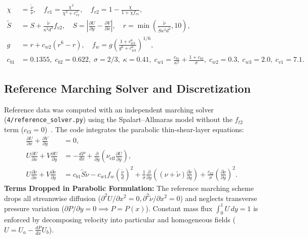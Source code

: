 \documentclass[11pt,a4paper]{article}
\begin{document}
\begin{align}
\chi &= \frac{\tilde{\nu}}{\nu}, \quad f_{v1} = \frac{\chi^3}{\chi^3 + c_{v1}^3}, \quad f_{v2} = 1 - \frac{\chi}{1 + \chi f_{v1}}, \\
\tilde{S} &= S + \frac{\tilde{\nu}}{\kappa^2 d^2} f_{v2}, \quad S = \left|\frac{\partial U}{\partial y} - \frac{\partial V}{\partial x}\right|, \quad r = \min\left(\frac{\tilde{\nu}}{\tilde{S} \kappa^2 d^2}, 10\right), \\
g &= r + c_{w2}(r^6 - r), \quad f_w = g \left(\frac{1 + c_{w3}^6}{g^6 + c_{w3}^6}\right)^{1/6}, \\
c_{b1} &= 0.1355, \; c_{b2} = 0.622, \; \sigma = 2/3, \; \kappa = 0.41, \; c_{w1} = \frac{c_{b1}}{\kappa^2} + \frac{1+c_{b2}}{\sigma}, \; c_{w2} = 0.3, \; c_{w3} = 2.0, \; c_{v1} = 7.1.
\end{align}

\subsection{Reference Marching Solver and Discretization}
Reference data was computed with an independent marching solver (\texttt{4/}\allowbreak\texttt{reference\_solver.py}) using the Spalart--Allmaras model without the $f_{t2}$ term ($c_{t3} = 0$)~\cite[Sec.~2.3, p.~3]{allmaras2012}. The code integrates the parabolic thin-shear-layer equations:
\begin{align}
\frac{\partial U}{\partial x} + \frac{\partial V}{\partial y} &= 0, \\
U \frac{\partial U}{\partial x} + V \frac{\partial U}{\partial y} &= -\frac{dP}{dx} + \frac{\partial}{\partial y}\left(\nu_{\mathrm{eff}}\frac{\partial U}{\partial y}\right), \\
U \frac{\partial \tilde{\nu}}{\partial x} + V \frac{\partial \tilde{\nu}}{\partial y} &= c_{b1}\tilde{S}\tilde{\nu} - c_{w1}f_w\left(\frac{\tilde{\nu}}{d}\right)^2 + \frac{1}{\sigma}\frac{\partial}{\partial y}\left((\nu+\tilde{\nu})\frac{\partial \tilde{\nu}}{\partial y}\right) + \frac{c_{b2}}{\sigma}\left(\frac{\partial \tilde{\nu}}{\partial y}\right)^2.
\end{align}
\noindent\textbf{Terms Dropped in Parabolic Formulation:} The reference marching scheme drops all streamwise diffusion ($\partial^2 U/\partial x^2 = 0, \partial^2 \tilde{\nu}/\partial x^2 = 0$) and neglects transverse pressure variation ($\partial P/\partial y = 0 \implies P = P(x)$). Constant mass flux $\int_0^1 U\,dy = 1$ is enforced by decomposing velocity into particular and homogeneous fields ($U = U_a - \frac{dP}{dx} U_b$).
\end{document}
